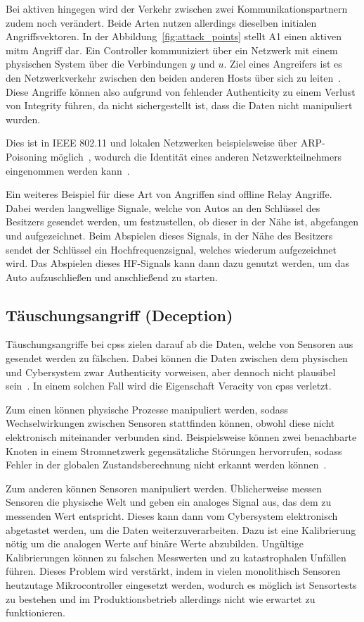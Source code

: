 \documentclass[final,bibliography=totocnumbered]{include/sikseminar}
\newcommand{\cps}{\glspl{cps}\xspace}
\begin{document}
Bei aktiven hingegen wird der Verkehr zwischen zwei Kommunikationspartnern zudem noch verändert.
Beide Arten nutzen allerdings dieselben initialen Angriffsvektoren.
In der Abbildung~\ref{fig:attack_points} stellt A1 einen aktiven \gls{mitm} Angriff dar.
Ein Controller kommuniziert über ein Netzwerk mit einem physischen System über die Verbindungen $y$ und $u$.
Ziel eines Angreifers ist es den Netzwerkverkehr zwischen den beiden anderen Hosts über sich zu leiten~\cite{WYX+10,FPA+18}.
Diese Angriffe können also aufgrund von fehlender Authenticity zu einem Verlust von Integrity führen, da nicht sichergestellt ist, dass die Daten nicht manipuliert wurden.

Dies ist in IEEE 802.11 und lokalen Netzwerken beispielsweise über ARP-Poisoning möglich~\cite{FIT+12}, wodurch die Identität eines anderen Netzwerkteilnehmers eingenommen werden kann~\cite{RN05}.

Ein weiteres Beispiel für diese Art von Angriffen sind offline Relay Angriffe.
Dabei werden langwellige Signale, welche von Autos an den Schlüssel des Besitzers gesendet werden, um festzustellen, ob dieser in der Nähe ist, abgefangen und aufgezeichnet.
Beim Abspielen dieses Signals, in der Nähe des Besitzers sendet der Schlüssel ein Hochfrequenzsignal, welches wiederum aufgezeichnet wird.
Das Abspielen dieses HF-Signals kann dann dazu genutzt werden, um das Auto aufzuschließen und anschließend zu starten.~\cite{HLL+17}

\subsection{Täuschungsangriff (Deception)}\label{subsec:tauschung} %
Täuschungsangriffe bei \cps zielen darauf ab die Daten, welche von Sensoren aus gesendet werden zu fälschen.
Dabei können die Daten zwischen dem physischen und Cybersystem zwar Authenticity vorweisen, aber dennoch nicht plausibel sein~\cite{SFJ17}.
In einem solchen Fall wird die Eigenschaft Veracity von \cps verletzt.

Zum einen können physische Prozesse manipuliert werden, sodass Wechselwirkungen zwischen Sensoren stattfinden können, obwohl diese nicht elektronisch miteinander verbunden sind.
Beispielsweise können zwei benachbarte Knoten in einem Stromnetzwerk gegensätzliche Störungen hervorrufen, sodass Fehler in der globalen Zustandsberechnung nicht erkannt werden können~\cite{KLG15}.

Zum anderen können Sensoren manipuliert werden.
Üblicherweise messen Sensoren die physische Welt und geben ein analoges Signal aus, das dem zu messenden Wert entspricht.
Dieses kann dann vom Cybersystem elektronisch abgetastet werden, um die Daten weiterzuverarbeiten.
Dazu ist eine Kalibrierung nötig um die analogen Werte auf binäre Werte abzubilden.
Ungültige Kalibrierungen können zu falschen Messwerten und zu katastrophalen Unfällen führen.
Dieses Problem wird verstärkt, indem in vielen monolithisch Sensoren heutzutage Mikrocontroller eingesetzt werden, wodurch es möglich ist Sensortests zu bestehen und im Produktionsbetrieb allerdings nicht wie erwartet zu funktionieren.~\cite{KLG15}
\end{document}
